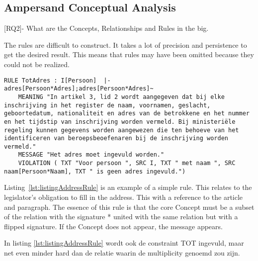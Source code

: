\def\rq{RQ2}
\subsection{Ampersand Conceptual Analysis}
[RQ2]- What are the Concepts, Relationships and Rules in the \acrshort{big}.

The rules are difficult to construct.
It takes a lot of precision and persistence to get the desired result.
This means that rules may have been omitted because they could not be realized.
\begin{lstlisting}[caption=Persoon.adl rule over CONCEPT \boxed{Adres}, numbers=none, label={lst:listingAddressRule}]
RULE TotAdres : I[Persoon]  |-  adres[Persoon*Adres];adres[Persoon*Adres]~
    MEANING "In artikel 3, lid 2 wordt aangegeven dat bij elke inschrijving in het register de naam, voornamen, geslacht, geboortedatum, nationaliteit en adres van de betrokkene en het nummer en het tijdstip van inschrijving worden vermeld. Bij ministeriële regeling kunnen gegevens worden aangewezen die ten behoeve van het identificeren van beroepsbeoefenaren bij de inschrijving worden vermeld."
    MESSAGE "Het adres moet ingevuld worden."
    VIOLATION ( TXT "Voor persoon ", SRC I, TXT " met naam ", SRC naam[Persoon*Naam], TXT " is geen adres ingevuld.")
\end{lstlisting}
Listing~\ref{lst:listingAddressRule} is an example of a simple rule.
This relates to the legislator's obligation to fill in the address.
This with a reference to the article and paragraph.
The essence of this rule is that the core Concept  must be a subset of the relation  with the signature * united with the same relation but with a flipped signature.
If the Concept  does not appear, the message appears.

In listing \ref{lst:listingAddressRule} wordt ook de constraint TOT ingevuld, maar net even minder hard dan de relatie waarin de multiplicity genoemd zou zijn.

